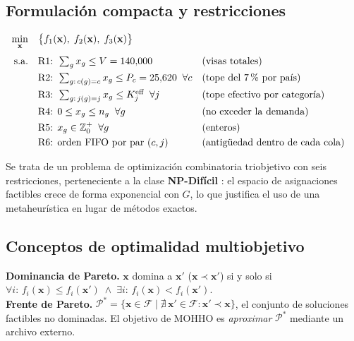 \documentclass[11pt,letterpaper]{article}
\begin{document}
\subsection{Formulación compacta y restricciones}
\begin{formulabox}
\begin{align*}
\min_{\mathbf{x}} \quad & \bigl\{ f_1(\mathbf{x}),\; f_2(\mathbf{x}),\; f_3(\mathbf{x}) \bigr\}\\[3pt]
\text{s.a.}\quad
& \text{R1: } \textstyle\sum_{g} x_g \leq V = 140{,}000 && \text{(visas totales)}\\
& \text{R2: } \textstyle\sum_{g:\,c(g)=c} x_g \leq P_c = 25{,}620 \;\; \forall c && \text{(tope del 7\,\% por país)}\\
& \text{R3: } \textstyle\sum_{g:\,j(g)=j} x_g \leq K_j^{\text{eff}} \;\; \forall j && \text{(tope efectivo por categoría)}\\
& \text{R4: } 0 \leq x_g \leq n_g \;\; \forall g && \text{(no exceder la demanda)}\\
& \text{R5: } x_g \in \mathbb{Z}^{+}_0 \;\; \forall g && \text{(enteros)}\\
& \text{R6: orden FIFO por par } (c,j) && \text{(antigüedad dentro de cada cola)}
\end{align*}
\end{formulabox}

Se trata de un problema de optimización combinatoria triobjetivo con seis restricciones, perteneciente a la clase \textbf{NP-Difícil} \parencite{gareyjohnson1979}: el espacio de asignaciones factibles crece de forma exponencial con $G$, lo que justifica el uso de una metaheurística en lugar de métodos exactos.

\subsection{Conceptos de optimalidad multiobjetivo}
\begin{formulabox}
\textbf{Dominancia de Pareto.} $\mathbf{x}$ domina a $\mathbf{x}'$ ($\mathbf{x} \prec \mathbf{x}'$) si y solo si
\(\forall i:\, f_i(\mathbf{x}) \leq f_i(\mathbf{x}') \;\wedge\; \exists i:\, f_i(\mathbf{x}) < f_i(\mathbf{x}').\)\\[3pt]
\textbf{Frente de Pareto.} $\mathcal{P}^* = \{\mathbf{x}\in\mathcal{F} \mid \nexists\, \mathbf{x}'\in\mathcal{F}:\mathbf{x}'\prec\mathbf{x}\}$, el conjunto de soluciones factibles no dominadas. El objetivo de MOHHO es \emph{aproximar} $\mathcal{P}^*$ mediante un archivo externo.
\end{formulabox}
\end{document}

